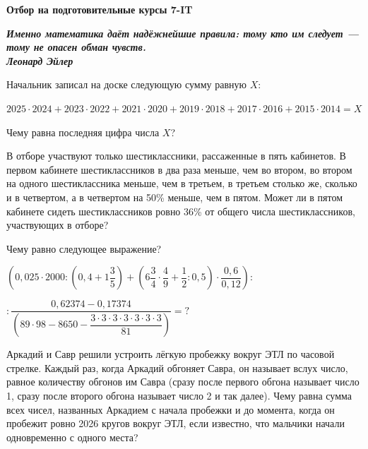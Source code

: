 \centerline{\bf \Huge Отбор на подготовительные курсы 7-IT}

\begin{flushright}
        \scriptsize{\textbf{\textit{Именно математика даёт надёжнейшие правила: тому кто им следует — тому не опасен обман чувств. \\Леонард Эйлер}}}
        
\end{flushright}

 Начальник записал на доске следующую сумму равную $X$: 

$2025\cdot2024 + 2023\cdot2022 + 2021\cdot2020 + 2019\cdot2018 + 2017\cdot2016 + 2015\cdot2014= X$

Чему равна последняя цифра числа $X$?

\hspace{3mm}

 В отборе участвуют только шестиклассники, рассаженные в пять кабинетов. В первом кабинете шестиклассников в два раза меньше, чем во втором, во втором на одного шестиклассника меньше, чем в третьем, в третьем столько же, сколько и в четвертом, а в четвертом на 50\% меньше, чем в пятом. Может ли в пятом кабинете сидеть шестиклассников ровно 36\% от общего числа шестиклассников, участвующих в отборе?

\hspace{3mm}

 Чему равно следующее выражение?

$\left(0,025\cdot2000 : \left(0,4 + 1\dfrac{3}{5}\right) + \left(6\dfrac{3}{4}\cdot\dfrac{4}{9} + \dfrac{1}{2} : 0,5\right)\cdot\dfrac{0,6}{0,12}\right):$

$:\dfrac{0,62374-0,17374}{\left(89\cdot98-8650-\dfrac{3\cdot3\cdot3\cdot3\cdot3\cdot3\cdot3}{81}\right)}=?$

\hspace{3mm}

 Аркадий и Савр решили устроить лёгкую пробежку вокруг ЭТЛ по часовой стрелке. Каждый раз, когда Аркадий обгоняет Савра, он называет вслух число, равное количеству обгонов им Савра (сразу после первого обгона называет число 1, сразу после второго обгона называет число 2 и так далее). Чему равна сумма всех чисел, названных Аркадием с начала пробежки и до момента, когда он пробежит ровно 2026 кругов вокруг ЭТЛ, если известно, что мальчики начали одновременно с одного места?

\hspace{3mm}


